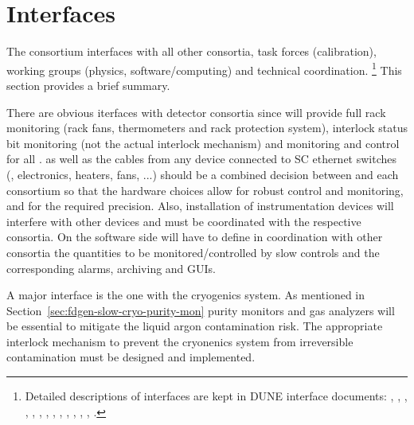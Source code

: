 \section{Interfaces}
\label{sec:fdgen-slow-cryo-intfc}


The  consortium interfaces with all other consortia, task forces (calibration), working groups (physics, software/computing) and technical coordination.
\footnote{
Detailed descriptions of  interfaces are kept in DUNE  interface documents: 
 \cite{bib:docdb6745},
\cite{bib:docdb6991},
\cite{bib:docdb6790},
\cite{bib:docdb6787},
\cite{bib:docdb6784},
\cite{bib:docdb6781},
\cite{bib:docdb6760},
\cite{bib:docdb6679},
\cite{bib:docdb6730},
\cite{bib:docdb7126},
\cite{bib:docdb7099},
\cite{bib:docdb7072},
\cite{bib:docdb7045},
\cite{bib:docdb7018}.} This section provides a brief summary. 

There are obvious iterfaces with detector consortia since  will provide full rack monitoring (rack fans, thermometers and rack protection system),
interlock status bit monitoring (not the actual interlock mechanism) and monitoring and control for all \pwrsupps. %
\pwrsupps as well as the cables from any device connected to SC ethernet switches (\pwrsupps, electronics, heaters, fans, ...)
should be a combined decision between  and each consortium so that the hardware choices allow for robust control and monitoring, and for the required precision. %
Also, installation of instrumentation devices will interfere with other devices and must be coordinated with the respective consortia.  
On the software side  will have to define in coordination with other consortia the quantities to be monitored/controlled by slow controls and the corresponding alarms,
archiving and GUIs. 



A major interface is the one with the cryogenics system. As mentioned in Section~\ref{sec:fdgen-slow-cryo-purity-mon} purity monitors and gas analyzers will be essential
to mitigate the liquid argon contamination risk. The appropriate interlock mechanism to prevent the cryonenics system from irreversible contamination
must be designed and implemented. 

